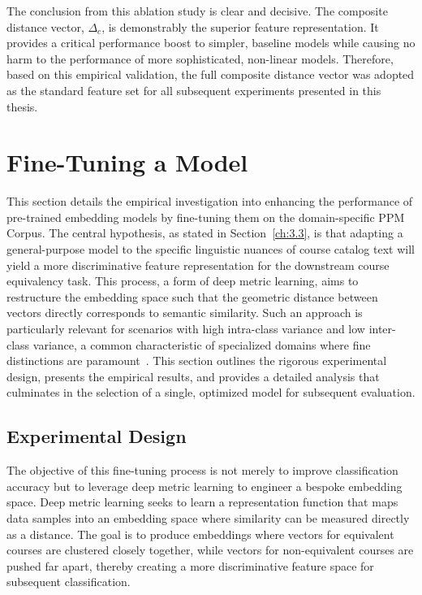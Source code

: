 The conclusion from this ablation study is clear and decisive. The composite distance vector, \(\Delta_c\), is demonstrably the superior feature representation. It provides a critical performance boost to simpler, baseline models while causing no harm to the performance of more sophisticated, non-linear models. Therefore, based on this empirical validation, the full composite distance vector was adopted as the standard feature set for all subsequent experiments presented in this thesis.

\section{Fine-Tuning a Model}
This section details the empirical investigation into enhancing the performance of pre-trained embedding models by fine-tuning them on the domain-specific PPM Corpus. The central hypothesis, as stated in Section~\ref{ch:3.3}, is that adapting a general-purpose model to the specific linguistic nuances of course catalog text will yield a more discriminative feature representation for the downstream course equivalency task. This process, a form of deep metric learning, aims to restructure the embedding space such that the geometric distance between vectors directly corresponds to semantic similarity. Such an approach is particularly relevant for scenarios with high intra-class variance and low inter-class variance, a common characteristic of specialized domains where fine distinctions are paramount~\cite{mohan2023deepmetriclearningcomputer}. This section outlines the rigorous experimental design, presents the empirical results, and provides a detailed analysis that culminates in the selection of a single, optimized model for subsequent evaluation.

\subsection{Experimental Design}
The objective of this fine-tuning process is not merely to improve classification accuracy but to leverage deep metric learning to engineer a bespoke embedding space. Deep metric learning seeks to learn a representation function that maps data samples into an embedding space where similarity can be measured directly as a distance. The goal is to produce embeddings where vectors for equivalent courses are clustered closely together, while vectors for non-equivalent courses are pushed far apart, thereby creating a more discriminative feature space for subsequent classification.

